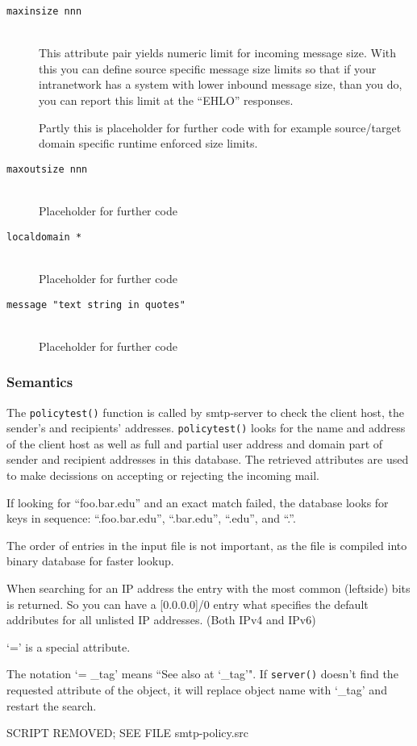 \begin{description}
\item[\tt maxinsize nnn] \mbox{} \\
This attribute pair yields numeric limit for incoming message
size.  With this you can define source specific message size
limits so that if your intranetwork has a system with lower
inbound message size, than you do, you can report this limit
at the ``EHLO'' responses.

Partly this is placeholder for further code with for example
source/target domain specific runtime enforced size limits.

\item[\tt maxoutsize nnn] \mbox{} \\
Placeholder for further code

\item[\tt localdomain *] \mbox{} \\
Placeholder for further code

\item[\tt message "text string in quotes"] \mbox{} \\
Placeholder for further code
\end{description}


\subsubsection{Semantics}



The {\tt policytest()} function is called by smtp-server to check the client 
host, the sender's and recipients' addresses.  {\tt policytest()} looks for 
the name and address of the client host as well as full and partial user address 
and domain part of sender and recipient addresses in this database.  The 
retrieved attributes are used to make decissions on accepting or rejecting 
the incoming mail.

If looking for ``foo.bar.edu'' and an exact match failed, the database looks
for keys in sequence:  ``.foo.bar.edu'', ``.bar.edu'', ``.edu'', and ``.''.

The order of entries in the input file is not important, as the file is
compiled into binary database for faster lookup.

When searching for an IP address the entry with the most common (leftside)
bits is returned.   So you can have a [0.0.0.0]/0 entry what specifies the 
default addributes for all unlisted IP addresses. (Both IPv4 and IPv6)

`=' is a special attribute.

The notation `= \_tag' means ``See also at `\_tag'". If {\tt server()} doesn't 
find the requested attribute of the object, it will replace object name 
with `\_tag' and restart the search.

{\Large SCRIPT REMOVED; SEE FILE  smtp-policy.src}
